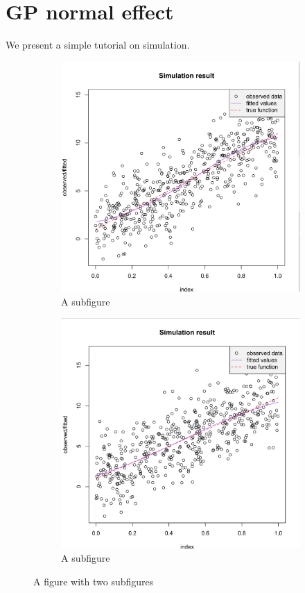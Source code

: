 \documentclass[11pt]{article}
\begin{document}
\section{GP normal effect}
  We present a simple tutorial on simulation.
  \begin{figure}
    \centering
    \begin{subfigure}{.5\textwidth}
      \centering
      \includegraphics[width=.4\linewidth]{GP_noRE}
      \caption{A subfigure}
      \label{fig:sub1}
    \end{subfigure}%
    \begin{subfigure}{.5\textwidth}
      \centering
      \includegraphics[width=.4\linewidth]{GP_normalRE_linear}
      \caption{A subfigure}
      \label{fig:sub2}
    \end{subfigure}
    \caption{A figure with two subfigures}
    \label{fig:test}
    \end{figure}
\end{document}
